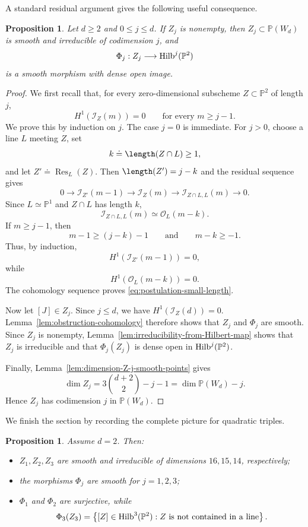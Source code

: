 \documentclass[11pt]{amsart} %
\newtheorem{Proposition}[Theorem]{Proposition}
\theoremstyle{definition}
\def\NZQ{\mathbb}               %
\def\PP{{\NZQ P}}
\def\Hilbert{{\rm Hilb}}
\begin{document}
A standard residual argument gives the following useful consequence.

\begin{Proposition}\label{prop:Z-smooth-irr-low-j}
Let $d\geq2$ and $0\leq j\leq d$. If $Z_j$ is nonempty, then
$Z_j\subset\PP(W_d)$ is smooth and irreducible of codimension $j$,
and
\[
\Phi_j:Z_j\longrightarrow\Hilbert^j(\PP^2)
\]
is a smooth morphism with dense open image.
\end{Proposition}

\begin{proof}
We first recall that, for every zero-dimensional subscheme
$Z\subset\PP^2$ of length $j$,
\begin{equation}\label{eq:postulation-small-length}
H^1(\mathcal I_Z(m))=0
\qquad\text{for every }m\geq j-1.
\end{equation}
We prove this by induction on $j$. The case $j=0$ is immediate. For $j>0$, choose a line $L$ meeting $Z$, set
\[
k\doteq\length(Z\cap L)\geq1,
\]
and let
\(
Z'\doteq\operatorname{Res}_L(Z)\). Then \(\length(Z')=j-k\) and the residual sequence gives
\[
0
\longrightarrow
\mathcal I_{Z'}(m-1)
\longrightarrow
\mathcal I_Z(m)
\longrightarrow
\mathcal I_{Z\cap L,L}(m)
\longrightarrow0.
\]
Since $L\simeq\PP^1$ and $Z\cap L$ has length $k$,
\[
\mathcal I_{Z\cap L,L}(m)
\simeq
\mathcal O_L(m-k).
\]
If $m\geq j-1$, then
\[
m-1\geq (j-k)-1
\qquad\text{and}\qquad
m-k\geq-1.
\]
Thus, by induction,
\[
H^1(\mathcal I_{Z'}(m-1))=0,
\]
while
\[
H^1(\mathcal O_L(m-k))=0.
\]
The cohomology sequence proves
\eqref{eq:postulation-small-length}.

Now let $[J]\in Z_j$. Since $j\leq d$, we have \(H^1(\mathcal I_Z(d))=0\). Lemma~\ref{lem:obstruction-cohomology} therefore shows that $Z_j$
and $\Phi_j$ are smooth. Since $Z_j$ is nonempty,
Lemma~\ref{lem:irreducibility-from-Hilbert-map} shows that $Z_j$ is
irreducible and that $\Phi_j(Z_j)$ is dense open in
$\Hilbert^j(\PP^2)$.

Finally, Lemma~\ref{lem:dimension-Z-j-smooth-points} gives
\[
\dim Z_j
=
3\binom{d+2}{2}-j-1
=
\dim\PP(W_d)-j.
\]
Hence $Z_j$ has codimension $j$ in $\PP(W_d)$.
\end{proof}

We finish the section by recording the complete picture for
quadratic triples.

\begin{Proposition}\label{prop:d-2-Phi-j}
Assume $d=2$. Then:

\begin{itemize}
\item[(a)] $Z_1,Z_2,Z_3$ are smooth and irreducible of dimensions
$16,15,14$, respectively;

\item[(b)] the morphisms $\Phi_j$ are smooth for $j=1,2,3$;

\item[(c)] $\Phi_1$ and $\Phi_2$ are surjective, while
\[
\Phi_3(Z_3)
=
\left\{
[Z]\in\Hilbert^3(\PP^2):
Z\text{ is not contained in a line}
\right\}.
\]
\end{itemize}
\end{Proposition}
\end{document}
